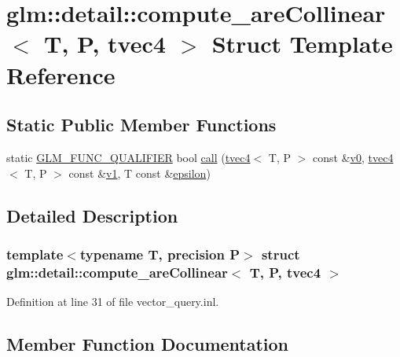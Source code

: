 \hypertarget{structglm_1_1detail_1_1compute__are_collinear_3_01_t_00_01_p_00_01tvec4_01_4}{}\section{glm\+::detail\+::compute\+\_\+are\+Collinear$<$ T, P, tvec4 $>$ Struct Template Reference}
\label{structglm_1_1detail_1_1compute__are_collinear_3_01_t_00_01_p_00_01tvec4_01_4}
\subsection*{Static Public Member Functions}
\begin{DoxyCompactItemize}
\item 
static \mbox{\hyperlink{setup_8hpp_a33fdea6f91c5f834105f7415e2a64407}{G\+L\+M\+\_\+\+F\+U\+N\+C\+\_\+\+Q\+U\+A\+L\+I\+F\+I\+ER}} bool \mbox{\hyperlink{structglm_1_1detail_1_1compute__are_collinear_3_01_t_00_01_p_00_01tvec4_01_4_a614f1eb934d5e74a6585898a059cf5a0}{call}} (\mbox{\hyperlink{structglm_1_1tvec4}{tvec4}}$<$ T, P $>$ const \&\mbox{\hyperlink{glad_8h_a7062a23d1d434121d4a88f530703d06a}{v0}}, \mbox{\hyperlink{structglm_1_1tvec4}{tvec4}}$<$ T, P $>$ const \&\mbox{\hyperlink{glad_8h_a0779c3b73f9aa3a0ac5b0139b5d291d9}{v1}}, T const \&\mbox{\hyperlink{group__gtc__constants_ga2a1e57fc5592b69cfae84174cbfc9429}{epsilon}})
\end{DoxyCompactItemize}


\subsection{Detailed Description}
\subsubsection*{template$<$typename T, precision P$>$\newline
struct glm\+::detail\+::compute\+\_\+are\+Collinear$<$ T, P, tvec4 $>$}



Definition at line 31 of file vector\+\_\+query.\+inl.



\subsection{Member Function Documentation}
\mbox{\label{structglm_1_1detail_1_1compute__are_collinear_3_01_t_00_01_p_00_01tvec4_01_4_a614f1eb934d5e74a6585898a059cf5a0}} 
